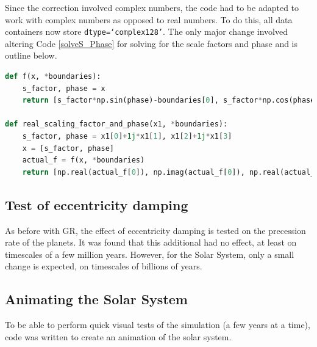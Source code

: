 \documentclass[11pt, oneside]{article}   	%
\begin{document}
Since the correction involved complex numbers, the code had to be adapted to work with complex numbers as opposed to real numbers. To do this, all data containers now store \texttt{dtype=`complex128'}. The only major change involved altering Code \ref{solveS_Phase} for solving for the scale factors and phase and is outline below.
\begin{lstlisting}[language=Python, caption={Change to Code \ref{solveS_Phase}}]
def f(x, *boundaries):
    s_factor, phase = x
    return [s_factor*np.sin(phase)-boundaries[0], s_factor*np.cos(phase)-boundaries[1]]

def real_scaling_factor_and_phase(x1, *boundaries):
    s_factor, phase = x1[0]+1j*x1[1], x1[2]+1j*x1[3] 
    x = [s_factor, phase]
    actual_f = f(x, *boundaries)
    return [np.real(actual_f[0]), np.imag(actual_f[0]), np.real(actual_f[1]), np.imag(actual_f[1])]
\end{lstlisting}

\subsection{Test of eccentricity damping}

As before with GR, the effect of eccentricity damping is tested on the precession rate of the planets. It was found that this additional had no effect, at least on timescales of a few million years. However, for the Solar System, only a small change is expected, on timescales of billions of years.

\subsection{Animating the Solar System}

To be able to perform quick visual tests of the simulation (a few years at a time), code was written to create an animation of the solar system.
\end{document}
